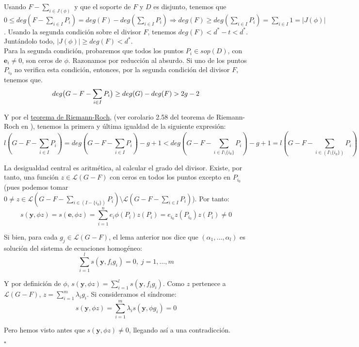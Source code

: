 \documentclass[11pt,spanish]{book}
\newcommand{\qed}{\begin{flushright} $\square$ \end{flushright}}
\begin{document}
Usando $F-\sum_{i\in J(\phi)}$ y que el soporte de $F$ y $D$ es disjunto, tenemos que $0\leq deg(F-\sum_{i\in I}P_i)=deg(F)-deg(\sum_{i\in I}P_i)\Rightarrow deg(F)\geq deg(\sum_{i\in I}P_i) = \sum_{i\in I}1=|J(\phi)|$. Usando la segunda condición sobre el divisor $F$, tenemos $deg(F)<d^{*}-t<d^{*}$. Juntándolo todo, $|J(\phi)|\geq deg(F)<d^{*}$.\\

Para la segunda condición, probaremos que todos los puntos $P_{i}\in sop(D)$, con $\mathbf{e}_i\neq 0$, son ceros de $\phi$. Razonamos por reducción al absurdo. Si uno de los puntos $P_{i_0}$ no verifica esta condición, entonces, por la segunda condición del divisor $F$, tenemos que.
$$ deg\big{(}G-F-\sum_{i\in I}P_i\big{)}\geq deg(G)-deg(F)>2g-2 $$

Y por el \hyperlink{riemann-roch}{teorema de Riemann-Roch}, (ver corolario 2.58 del teorema de Riemann-Roch en \cite{Tom-Høholdt}), tenemos la primera y última igualdad de la siguiente expresión:
$$l(G-F-\sum_{i\in I}P_i)=deg(G-F-\sum_{i\in I}P_i)-g+1<deg(G-F-\sum_{i\in I\setminus\{i_{0}\}}P_i)-g+1=l(G-F-\sum_{i\in (I\setminus\{i_{0}\})}P_i)$$

La desigualdad central es aritmética, al calcular el grado del divisor. Existe, por tanto, una función $z\in \mathcal{L}(G-F)$ con ceros en todos los puntos excepto en $P_{i_0}$ (pues podemos tomar $0\neq z\in \mathcal{L}(G-F-\sum_{i\in (I-\{i_{0}\})}P_i)\setminus \mathcal{L}(G-F-\sum_{i\in I}P_i)$). Por tanto:
$$ s(\mathbf{y},\phi z) = s(\mathbf{e},\phi z)=\sum_{i=1}^{n}e_{i}\phi (P_{i})z(P_i) =e_{i_{0}}z(P_{i_{0}})z(P_i)\neq 0$$

Si bien, para cada $g_j\in\mathcal{L}(G-F)$, el lema anterior nos dice que $(\alpha_1,\ldots,\alpha_l)$ es solución del sistema de ecuaciones homogéneo:
$$\sum_{i=1}^{l}s(\mathbf{y},f_ig_i)=0,\;j=1,\ldots,m$$

Y por definición de $\phi$, $s(\mathbf{y},\phi z)=\sum_{i=1}^{l}s(\mathbf{y},f_ig_i)$. Como $z$ pertenece a $\mathcal{L}(G-F)$, $z=\sum_{i=1}^{m}\lambda_ig_i$. Si consideramos el síndrome:
$$s(\mathbf{y},\phi z)=\sum_{i=1}^{m}\lambda_{i} s(\mathbf{y},\phi g_i)=0$$

Pero hemos visto antes que $s(\mathbf{y},\phi z)\neq 0$, llegando así a una contradicción.
\qed
\end{document}
